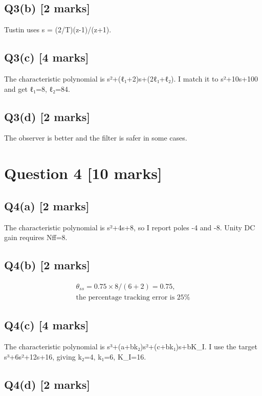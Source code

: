 \documentclass[11pt,a4paper]{article}
\begin{document}
\subsection*{Q3(b) \hfill [2 marks]}

Tustin uses s = (2/T)(z-1)/(z+1).

\subsection*{Q3(c) \hfill [4 marks]}

The characteristic polynomial is s²+(ℓ₁+2)s+(2ℓ₁+ℓ₂).
I match it to s²+10s+100 and get ℓ₁=8, ℓ₂=84.

\subsection*{Q3(d) \hfill [2 marks]}

The observer is better and the filter is safer in some cases.

\section*{Question 4 \hfill [10 marks]}
\subsection*{Q4(a) \hfill [2 marks]}

The characteristic polynomial is s²+4s+8, so I report poles -4 and -8.
Unity DC gain requires Nff=8.

\subsection*{Q4(b) \hfill [2 marks]}

\[\begin{aligned}\theta_{ss} = 0.75\times8/(6+2)=0.75,\\ \text{the percentage tracking error is 25\%}\end{aligned}\]

\subsection*{Q4(c) \hfill [4 marks]}

The characteristic polynomial is s³+(a+bk₂)s²+(c+bk₁)s+bK\_I.
I use the target s³+6s²+12s+16, giving k₂=4, k₁=6, K\_I=16.

\subsection*{Q4(d) \hfill [2 marks]}
\end{document}
